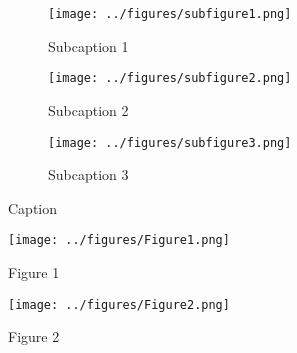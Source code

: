 
\begin{figure}[h] %
    \centering
    \begin{subfigure}[t]{.32\textwidth}
        \texttt{[image: ../figures/subfigure1.png]}
        \caption{Subcaption 1}
        \label{fig:subfigure1}
    \end{subfigure}
    \begin{subfigure}[t]{.32\textwidth}
        \texttt{[image: ../figures/subfigure2.png]}
        \caption{Subcaption 2}
        \label{fig:subfigure2}
    \end{subfigure}
    \begin{subfigure}[t]{.32\textwidth}
        \texttt{[image: ../figures/subfigure3.png]}
        \caption{Subcaption 3}
        \label{fig:subfigure3}
    \end{subfigure}
    \caption{Caption}
    \label{fig:figures}
\end{figure}

\begin{figure}[h] %
    \centering
    \begin{minipage}[t]{0.49\linewidth}
        \texttt{[image: ../figures/Figure1.png]}
        \caption{Figure 1}
        \label{fig:figure1}
    \end{minipage}
    \begin{minipage}[t]{0.49\linewidth}
        \texttt{[image: ../figures/Figure2.png]}
        \caption{Figure 2}
        \label{fig:figure2}
    \end{minipage}
\end{figure}


